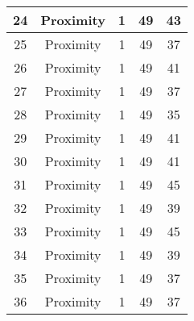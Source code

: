 \documentclass[results.tex]{subfiles}
\begin{document}
\begin{center}
\begin{tabular}{| c || c | c | c | c |}
            \hline
            24                      & Proximity                    & 1                      & 49                      & 43                   \\
            \hline
            25                      & Proximity                    & 1                      & 49                      & 37                   \\
            \hline
            26                      & Proximity                    & 1                      & 49                      & 41                   \\
            \hline
            27                      & Proximity                    & 1                      & 49                      & 37                   \\
            \hline
            28                      & Proximity                    & 1                      & 49                      & 35                   \\
            \hline
            29                      & Proximity                    & 1                      & 49                      & 41                   \\
            \hline
            30                      & Proximity                    & 1                      & 49                      & 41                   \\
            \hline
            31                      & Proximity                    & 1                      & 49                      & 45                   \\
            \hline
            32                      & Proximity                    & 1                      & 49                      & 39                   \\
            \hline
            33                      & Proximity                    & 1                      & 49                      & 45                   \\
            \hline
            34                      & Proximity                    & 1                      & 49                      & 39                   \\
            \hline
            35                      & Proximity                    & 1                      & 49                      & 37                   \\
            \hline
            36                      & Proximity                    & 1                      & 49                      & 37                   \\

\end{tabular}
\end{center}
\end{document}
